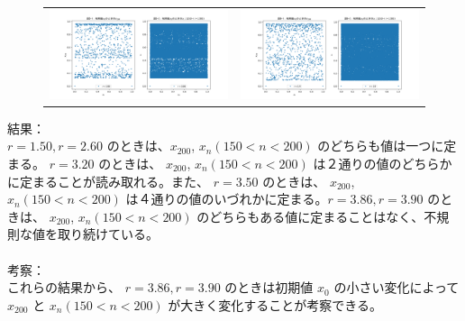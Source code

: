 \begin{figure}[htbp]
\begin{tabular}{cc}
    \begin{minipage}[t]{0.45\hsize}
      \centering
      \includegraphics[keepaspectratio, scale=0.25]{images/Problem2/ctest3_5.png}
    \end{minipage} &
    \begin{minipage}[t]{0.45\hsize}
      \centering
      \includegraphics[keepaspectratio, scale=0.25]{images/Problem2/ctest3_6.png}
    \end{minipage}
  \end{tabular}
\end{figure}


結果：\\
$r = 1.50, r = 2.60$ のときは、$x_{200}$, $x_n (150 < n < 200)$ のどちらも値は一つに定まる。 $r = 3.20$ のときは、 $x_{200}$, $x_n (150 < n < 200)$ は２通りの値のどちらかに定まることが読み取れる。また、 $r = 3.50$ のときは、 $x_{200}$, $x_n (150 < n < 200)$ は４通りの値のいづれかに定まる。$r = 3.86, r = 3.90$ のときは、 $x_{200}$, $x_n (150 < n < 200)$ のどちらもある値に定まることはなく、不規則な値を取り続けている。\\\\

考察：\\
これらの結果から、 $r = 3.86, r = 3.90$ のときは初期値 $x_0$ の小さい変化によって$x_{200}$ と $x_n (150 < n < 200)$ が大きく変化することが考察できる。

